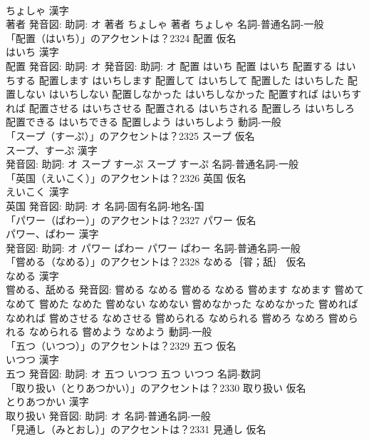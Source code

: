 \documentclass[8pt]{extreport}
\begin{document}
\begin{CJK}{UTF8}{min}
\\	ちょしゃ 漢字　
\\	著者 発音図: 助詞: オ	著者 ちょしゃ		著者 ちょしゃ				名詞-普通名詞-一般 
\\	「配置（はいち）」のアクセントは？2324	配置 仮名　
\\	はいち 漢字　
\\	配置 発音図: 助詞: オ 発音図: 助詞: オ	配置 はいち		配置 はいち 配置する はいちする 配置します はいちします 配置して はいちして 配置した はいちした 配置しない はいちしない 配置しなかった はいちしなかった 配置すれば はいちすれば 配置させる はいちさせる 配置される はいちされる 配置しろ はいちしろ 配置できる はいちできる 配置しよう はいちしよう				動詞-一般 
\\	「スープ（すーぷ）」のアクセントは？2325	スープ 仮名　
\\	スープ、すーぷ 漢字　
\\	発音図: 助詞: オ	スープ すーぷ		スープ すーぷ				名詞-普通名詞-一般 
\\	「英国（えいこく）」のアクセントは？2326	英国 仮名　
\\	えいこく 漢字　
\\	英国 発音図: 助詞: オ							名詞-固有名詞-地名-国 
\\	「パワー（ぱわー）」のアクセントは？2327	パワー 仮名　
\\	パワー、ぱわー 漢字　
\\	発音図: 助詞: オ	パワー ぱわー		パワー ぱわー				名詞-普通名詞-一般 
\\	「嘗める（なめる）」のアクセントは？2328	なめる｛甞；舐｝ 仮名　
\\	なめる 漢字　
\\	嘗める、舐める 発音図:	嘗める なめる		嘗める なめる 嘗めます なめます 嘗めて なめて 嘗めた なめた 嘗めない なめない 嘗めなかった なめなかった 嘗めれば なめれば 嘗めさせる なめさせる 嘗められる なめられる 嘗めろ なめろ 嘗められる なめられる 嘗めよう なめよう				動詞-一般 
\\	「五つ（いつつ）」のアクセントは？2329	五つ 仮名　
\\	いつつ 漢字　
\\	五つ 発音図: 助詞: オ	五つ いつつ		五つ いつつ				名詞-数詞 
\\	「取り扱い（とりあつかい）」のアクセントは？2330	取り扱い 仮名　
\\	とりあつかい 漢字　
\\	取り扱い 発音図: 助詞: オ							名詞-普通名詞-一般 
\\	「見通し（みとおし）」のアクセントは？2331	見通し 仮名　

\end{CJK}
\end{document}
